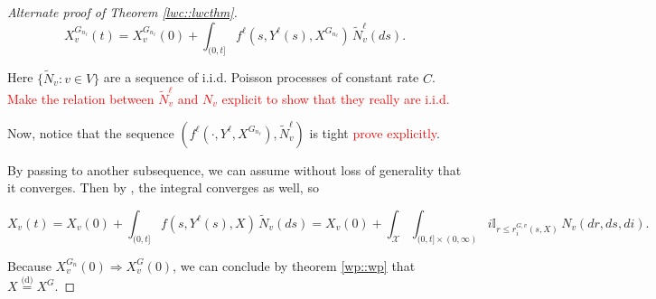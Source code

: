 \documentclass[12pt]{article}
\newcommand{\mb}{\mathbb}
\newcommand{\mc}{\mathcal}
\newcommand{\tr}{\textcolor{red}}
\newcommand{\deq}{\overset{\text{(d)}}{=}}			%
\newcommand{\sta}{\mc{X}}							%
\newcommand{\Xf}{X}									%
\newcommand{\poiss}{N}								%
\newcommand{\rate}{r}								%
\newcommand{\poissv}[1]{_{#1}}						%
\newcommand{\vind}[1]{_{#1}}						%
\newcommand{\tme}[1]{(#1)}							%
\newcommand{\gind}[1]{^{#1}}						%
\newcommand{\stpara}[1]{_{#1}}						%
\newcommand{\gvpara}[2]{^{#1,#2}}					%
\newcommand{\tmepro}[2]{(#1,#2)}					%
\newcommand{\Xg}{Y}									%
\newcommand{\alt}[1]{\tilde{#1}}					%
\renewcommand{\it}[1]{_{#1}}						%
\begin{document}
\begin{proof}[Alternate proof of Theorem \ref{lwc::lwcthm}]
\[\Xf\gind{G\it{n_\ell}}\vind{v}\tme{t} = \Xf\gind{G\it{n_\ell}}\vind{v}\tme{0} + \int_{(0,t]} f^\ell(s,\Xg^\ell\tme{s},\Xf\gind{G\it{n_\ell}})\,\alt{\poiss}\poissv{v}^\ell(ds).\]

Here \(\{\alt{\poiss}\poissv{v}:v \in V\}\) are a sequence of i.i.d. Poisson processes of constant rate \(C\). \tr{Make the relation between \(\alt{\poiss}\poissv{v}^\ell\) and \(\poiss\poissv{v}\) explicit to show that they really are i.i.d.}

Now, notice that the sequence \((f^\ell(\cdot,\Xg^\ell,\Xf\gind{G\it{n_\ell}}), \alt{\poiss}\poissv{v}^\ell)\) is tight \tr{prove explicitly}.

By passing to another subsequence, we can assume without loss of generality that it converges. Then by \cite[Theorem 2.2, Remark 2.5]{KurPro91}, the integral converges as well, so 

\[\Xf\vind{v}\tme{t} = \Xf\vind{v}\tme{0} + \int_{(0,t]} f(s,\Xg^\ell(s),\Xf)\,\alt{\poiss}\poissv{v}(ds) = \Xf\vind{v}\tme{0} + \int_\sta\int_{(0,t]\times(0,\infty)} i\mb{I}_{r \leq \rate\gvpara{G}{v}\stpara{i}\tmepro{s}{\Xf}}\,\poiss\poissv{v}(dr,ds,di).\]

Because \(\Xf\gind{G\it{n}}\vind{v}\tme{0} \Rightarrow \Xf\gind{G}\vind{v}\tme{0}\), we can conclude by theorem \ref{wp::wp} that \(\Xf \deq \Xf\gind{G}\).
\end{proof}
\newpage


\end{document}

